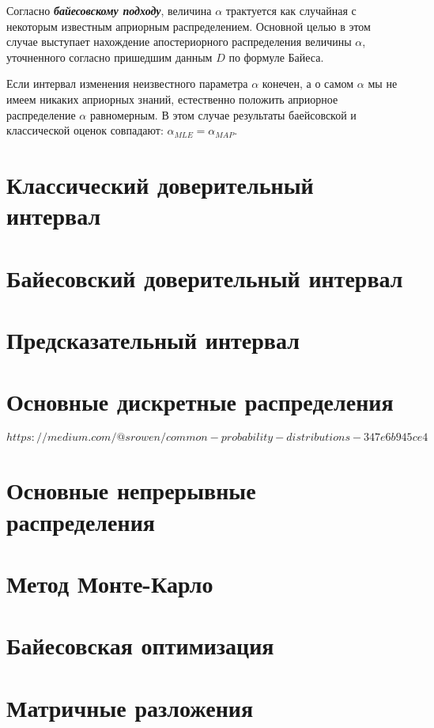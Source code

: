 Согласно \textbf{\textit{байесовскому подходу}}, величина $\alpha$ трактуется как случайная с некоторым известным априорным распределением. Основной целью в этом случае выступает нахождение апостериорного распределения величины $\alpha$, уточненного согласно пришедшим данным $D$ по формуле Байеса.

Если интервал изменения неизвестного параметра $\alpha$ конечен, а о самом $\alpha$ мы не имеем никаких априорных знаний, естественно положить априорное распределение $\alpha$ равномерным. В этом случае результаты баейсовской и классической оценок совпадают: $\alpha_{MLE} = \alpha_{MAP}$.


\section{Классический доверительный интервал}


\section{Байесовский доверительный интервал}


\section{Предсказательный интервал}


\section{Основные дискретные распределения}

$https://medium.com/@srowen/common-probability-distributions-347e6b945ce4$


\section{Основные непрерывные распределения}


\section{Метод Монте-Карло}


\section{Байесовская оптимизация}


\section{Матричные разложения}

